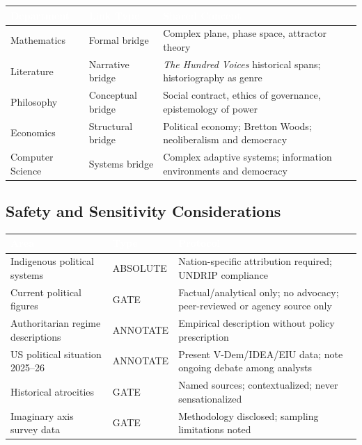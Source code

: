 \documentclass[11pt,letterpaper]{article}
\newcommand{\tableheader}[1]{\textbf{\sffamily\textcolor{white}{#1}}}
\begin{document}
\begin{center}
\begin{tabularx}{\textwidth}{L{3cm}L{3.5cm}X}
\toprule
{}
\tableheader{Department} & \tableheader{Link Type} & \tableheader{Shared Concept} \\
\midrule
Mathematics & Formal bridge & Complex plane, phase space, attractor theory \\
Literature & Narrative bridge & \textit{The Hundred Voices} historical spans; historiography as genre \\
Philosophy & Conceptual bridge & Social contract, ethics of governance, epistemology of power \\
Economics & Structural bridge & Political economy; Bretton Woods; neoliberalism and democracy \\
Computer Science & Systems bridge & Complex adaptive systems; information environments and democracy \\
\bottomrule
\end{tabularx}
\end{center}

\subsection{Safety and Sensitivity Considerations}

\begin{center}
\begin{tabularx}{\textwidth}{L{4cm}L{2cm}X}
\toprule
{}
\tableheader{Area} & \tableheader{Type} & \tableheader{Protocol} \\
\midrule
Indigenous political systems & ABSOLUTE & Nation-specific attribution required; UNDRIP compliance \\
Current political figures & GATE & Factual/analytical only; no advocacy; peer-reviewed or agency source only \\
Authoritarian regime descriptions & ANNOTATE & Empirical description without policy prescription \\
US political situation 2025--26 & ANNOTATE & Present V-Dem/IDEA/EIU data; note ongoing debate among analysts \\
Historical atrocities & GATE & Named sources; contextualized; never sensationalized \\
Imaginary axis survey data & GATE & Methodology disclosed; sampling limitations noted \\
\bottomrule
\end{tabularx}
\end{center}
\end{document}
